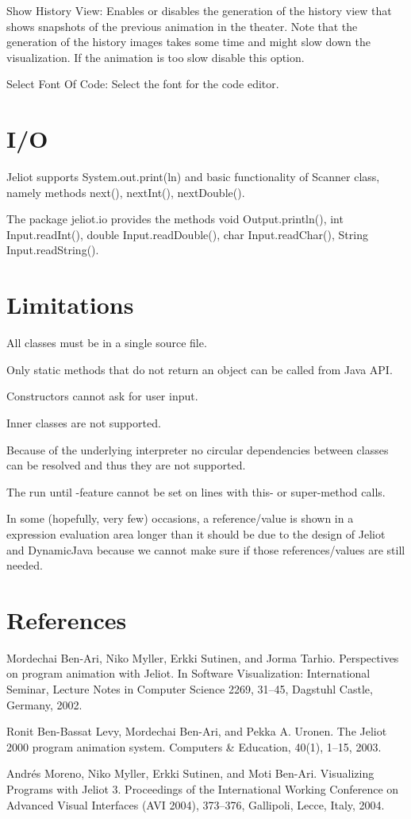 \documentclass{article}
\begin{document}
Show History View: Enables or disables the generation of the history view that
shows snapshots of the previous animation in the theater. Note that the generation of
the history images takes some time and might slow down the visualization. If the animation
is too slow disable this option.

Select Font Of Code: Select the font for the code editor.

\section{I/O}

Jeliot supports System.out.print(ln) and basic functionality of Scanner class, namely methods next(), nextInt(), nextDouble().

The package jeliot.io provides the methods void Output.println(), int Input.readInt(), double Input.readDouble(), 
char Input.readChar(), String Input.readString().

\section{Limitations}

All classes must be in a single source file. 

Only static methods that do not return an object can be called from Java API.

Constructors cannot ask for user input.

Inner classes are not supported.

Because of the underlying interpreter no circular dependencies between classes can be resolved and thus they are not supported.

The run until -feature cannot be set on lines with this- or super-method calls.

In some (hopefully, very few) occasions, a reference/value is shown in a expression evaluation area longer than it should be due to the design of Jeliot and DynamicJava because we cannot make sure if those references/values are still needed.

\section{References}

Mordechai Ben-Ari, Niko Myller, Erkki Sutinen, and Jorma Tarhio. Perspectives 
on program animation with Jeliot. In Software Visualization: International 
Seminar, Lecture Notes in Computer Science 2269, 31--45, Dagstuhl Castle, 
Germany, 2002.

Ronit Ben-Bassat Levy, Mordechai Ben-Ari, and Pekka A. Uronen. The Jeliot 2000 
program animation system. Computers \& Education, 40(1), 1--15, 2003.

Andr\'{e}s Moreno, Niko Myller, Erkki Sutinen, and Moti Ben-Ari. Visualizing Programs with Jeliot 3. Proceedings of the International Working Conference on Advanced Visual Interfaces (AVI 2004), 373--376, Gallipoli, Lecce, Italy, 2004.
\end{document}
